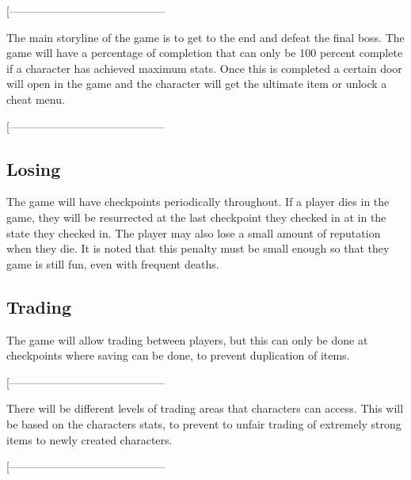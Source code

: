 \documentclass[9pt]{article}
\begin{document}
\smallskip
[------------------------------------------
\smallskip

The main storyline of the game is to get to the end and defeat the final boss. The game will have a percentage of completion that can only be 100 percent complete if a character has achieved maximum stats. Once this is completed a certain door will open in the game and the character will get the ultimate item or unlock a cheat menu.

\smallskip
[------------------------------------------










\subsection*{Losing}
The game will have checkpoints periodically throughout. If a player 
dies in the game, they will be resurrected at the last checkpoint they
checked in at in the state they checked in. The player may also lose
a small amount of reputation when they die. It is noted that this 
penalty must be small enough so that they game is still fun, even 
with frequent deaths. 












\subsection*{Trading}
The game will allow trading between players, but this can only be done
at checkpoints where saving can be done, to prevent duplication of items.

\smallskip
[------------------------------------------
\smallskip

There will be different levels of trading areas that characters can access. This will be based on the characters stats, to prevent to unfair trading of extremely strong items to newly created characters.

\smallskip
[------------------------------------------










\newpage
\end{document}
